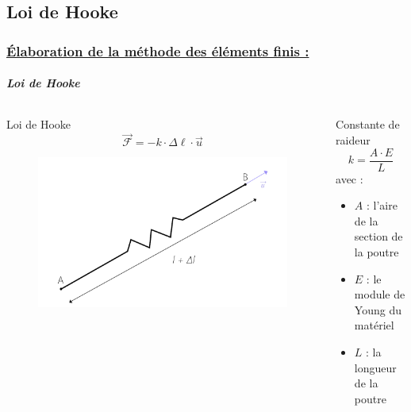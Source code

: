 \documentclass[10pt]{beamer}
\begin{document}
	\subsection{Loi de Hooke}
	\begin{frame}
		\frametitle{\uline{\'Elaboration de la m\'ethode des \'el\'ements finis :}}
		\framesubtitle{\textit{Loi de Hooke}}
		\begin{columns}[t]
 			\begin{column}{5cm}
 				\begin{block}{Loi de Hooke}
					\begin{equation}
  						\vec{\mathcal{F}} = - \mathit{k} \cdot \Delta \ell \cdot \vec{u}
  					\end{equation}
				\end{block}
				\begin{figure}
 				 	\includegraphics[scale=0.62]{Images/Hooke.png}
 				\end{figure}
			\end{column}
			\begin{column}{5cm}
				\begin{block}{Constante de raideur}
					\begin{equation}
						\mathit{k} = \frac{\mathit{A} \cdot \mathit{E}}{\mathit{L}}
					\end{equation}
					avec :\\
  					\begin{itemize}
  						\item $\mathit{A}$ : l'aire de la section de la poutre
  						\item $\mathit{E}$ : le module de Young du matériel
  						\item $\mathit{L}$ : la longueur de la poutre
  					\end{itemize}
				\end{block}
  			\end{column}
 		\end{columns}
	\end{frame}
\end{document}
